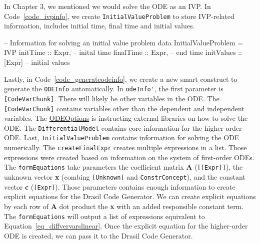 In Chapter 3, we mentioned we would solve the ODE as an IVP. In Code~\ref{code_ivpinfo}, we create \verb|InitialValueProblem| to store IVP-related information, includes initial time, final time and initial values.
\begin{listing}[ht]
\begin{haskell1}
-- Information for solving an initial value problem
data InitialValueProblem = IVP{
  initTime :: Expr, -- inital time
  finalTime :: Expr, -- end time
  initValues :: [Expr] -- initial values
}
\end{haskell1}
\label{code_ivpinfo}
\end{listing}

Lastly, in Code~\ref{code_generateodeinfo}, we create a new smart construct to generate the \verb|ODEInfo| automatically. In \verb|odeInfo'|, the first parameter is \verb|[CodeVarChunk]|. There will likely be other variables in the ODE. The \verb|[CodeVarChunk]| contains variables other than the dependent and independent variables. The \href{https://jacquescarette.github.io/Drasil/docs/full/drasil-code-0.1.9.0/Language-Drasil-Data-ODEInfo.html#t:ODEOptions}{ODEOptions} is instructing external libraries on how to solve the ODE. The \verb|DifferentialModel| contains core information for the higher-order ODE. Last, \verb|InitialValueProblem| contains information for solving the ODE numerically. The \verb|createFinalExpr| creates multiple expressions in a list. Those expressions were created based on information on the system of first-order ODEs. The \verb|formEquations| take parameters the coefficient matrix \textbf{A} (\verb|[[Expr]]|), the unknown vector \textbf{x} (combing \verb|[Unknown]| and \verb|ConstrConcept|), and the constant vector \textbf{c} (\verb|[Expr]|). Those parameters contains enough information to create explicit equations for the Drasil Code Generator. We can create explicit equations by each row of \textbf{A} dot product the \textbf{x} with an added responsible constant term. The \verb|formEquations| will output a list of expressions equivalent to Equation~\ref{eq_diffvervarslinear}. Once the explicit equation for the higher-order ODE is created, we can pass it to the Drasil Code Generator.

